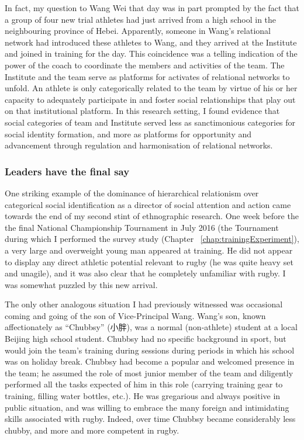 \begin{CJK}{UTF8}{gbsn}
In fact, my question to Wang Wei that day was in part prompted by the fact that a group of four new trial athletes had just arrived from a high school in the neighbouring province of Hebei.  Apparently, someone in Wang's relational network had introduced these athletes to Wang, and they arrived at the Institute and joined in training for the day.  This coincidence was a telling indication of the power of the coach to coordinate the members and activities of the team.  The Institute and the team serve as platforms for activates of relational networks to unfold.  An athlete is only categorically related to the team by virtue of his or her capacity to adequately participate in and foster social relationships that play out on that institutional platform.  In this research setting, I found evidence that social categories of team and Institute served less as sanctimonious categories for social identity formation, and more as platforms for opportunity and advancement through regulation and harmonisation of relational networks.

\subsubsection{Leaders have the final say\label{sect:leadersFinalSay}}
One striking example of the dominance of hierarchical relationism over categorical social identification as a director of social attention and action came towards the end of my second stint of ethnographic research. One week before the the final National Championship Tournament in July 2016 (the Tournament during which I performed the survey study (Chapter ~\ref{chap:trainingExperiment}), a very large and overweight young man appeared at training.  He did not appear to display any direct athletic potential relevant to rugby (he was quite heavy set and unagile), and it was also clear that he completely unfamiliar with rugby.  I was somewhat puzzled by this new arrival.

The only other analogous situation I had previously witnessed was occasional coming and going of the son of Vice-Principal Wang. Wang's son, known affectionately as ``Chubbsy'' (小胖), was a normal (non-athlete) student at a local Beijing high school student.  Chubbsy had no specific background in sport, but would join the team's training during sessions during periods in which his school was on holiday break.  Chubbsy had become a popular and welcomed presence in the team; he assumed the role of most junior member of the team and diligently performed all the tasks expected of him in this role (carrying training gear to training, filling water bottles, etc.). He was gregarious and always positive in public situation, and was willing to embrace the many foreign and intimidating skills associated with rugby. Indeed, over time Chubbsy became considerably less chubby, and more and more competent in rugby.


\end{CJK}
